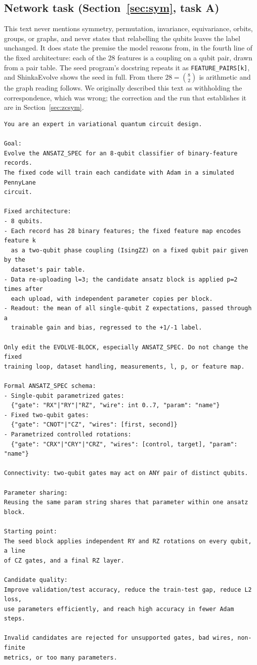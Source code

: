 \subsection{Network task (Section~\ref{sec:sym}, task A)}

This text never mentions symmetry, permutation, invariance, equivariance, orbits,
groups, or graphs, and never states that relabelling the qubits leaves the label
unchanged. It does state the premise the model reasons from, in the fourth line
of the fixed architecture: each of the 28 features is a coupling on a qubit pair,
drawn from a pair table. The seed program's docstring repeats it as
\texttt{FEATURE\_PAIRS[k]}, and ShinkaEvolve shows the seed in full. From there
$28 = \binom{8}{2}$ is arithmetic and the graph reading follows. We originally
described this text as withholding the correspondence, which was wrong; the
correction and the run that establishes it are in Section~\ref{sec:zcsym}.

\begin{lstlisting}[style=prompt]
You are an expert in variational quantum circuit design.

Goal:
Evolve the ANSATZ_SPEC for an 8-qubit classifier of binary-feature records.
The fixed code will train each candidate with Adam in a simulated PennyLane
circuit.

Fixed architecture:
- 8 qubits.
- Each record has 28 binary features; the fixed feature map encodes feature k
  as a two-qubit phase coupling (IsingZZ) on a fixed qubit pair given by the
  dataset's pair table.
- Data re-uploading l=3; the candidate ansatz block is applied p=2 times after
  each upload, with independent parameter copies per block.
- Readout: the mean of all single-qubit Z expectations, passed through a
  trainable gain and bias, regressed to the +1/-1 label.

Only edit the EVOLVE-BLOCK, especially ANSATZ_SPEC. Do not change the fixed
training loop, dataset handling, measurements, l, p, or feature map.

Formal ANSATZ_SPEC schema:
- Single-qubit parametrized gates:
  {"gate": "RX"|"RY"|"RZ", "wire": int 0..7, "param": "name"}
- Fixed two-qubit gates:
  {"gate": "CNOT"|"CZ", "wires": [first, second]}
- Parametrized controlled rotations:
  {"gate": "CRX"|"CRY"|"CRZ", "wires": [control, target], "param": "name"}

Connectivity: two-qubit gates may act on ANY pair of distinct qubits.

Parameter sharing:
Reusing the same param string shares that parameter within one ansatz block.

Starting point:
The seed block applies independent RY and RZ rotations on every qubit, a line
of CZ gates, and a final RZ layer.

Candidate quality:
Improve validation/test accuracy, reduce the train-test gap, reduce L2 loss,
use parameters efficiently, and reach high accuracy in fewer Adam steps.

Invalid candidates are rejected for unsupported gates, bad wires, non-finite
metrics, or too many parameters.
\end{lstlisting}


